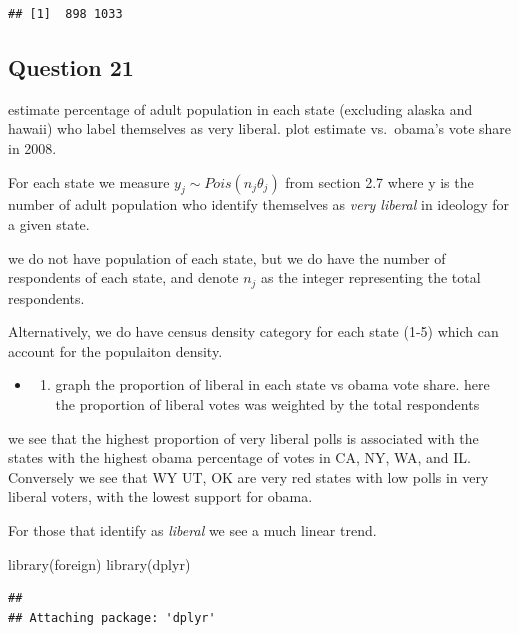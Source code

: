 \documentclass[
]{book}
\newenvironment{Shaded}{\begin{snugshade}}{\end{snugshade}}
\newcommand{\FunctionTok}[1]{\textcolor[rgb]{0.00,0.00,0.00}{#1}}
\newcommand{\NormalTok}[1]{#1}
\providecommand{\tightlist}{%
  \setlength{\itemsep}{0pt}\setlength{\parskip}{0pt}}
\theoremstyle{definition}
\theoremstyle{definition}
\theoremstyle{definition}
\theoremstyle{definition}
\theoremstyle{remark}
\begin{document}
\begin{verbatim}
## [1]  898 1033
\end{verbatim}

\hypertarget{question-21}{%
\subsection{Question 21}\label{question-21}}

estimate percentage of adult population in each state (excluding alaska and hawaii) who label themselves as very liberal. plot estimate vs.~obama's vote share in 2008.

For each state we measure \(y_j\sim Pois(n_j\theta_j)\) from section 2.7 where y is the number of adult population who identify themselves as \emph{very liberal} in ideology for a given state.

we do not have population of each state, but we do have the number of respondents of each state, and denote \(n_j\) as the integer representing the total respondents.

Alternatively, we do have census density category for each state (1-5) which can account for the populaiton density.

\begin{itemize}
\item
  \begin{enumerate}
  \def\labelenumi{(\alph{enumi})}
  \tightlist
  \item
    graph the proportion of liberal in each state vs obama vote share. here the proportion of liberal votes was weighted by the total respondents
  \end{enumerate}
\end{itemize}

we see that the highest proportion of very liberal polls is associated with the states with the highest obama percentage of votes in CA, NY, WA, and IL. Conversely we see that WY UT, OK are very red states with low polls in very liberal voters, with the lowest support for obama.

For those that identify as \emph{liberal} we see a much linear trend.

\begin{Shaded}
\begin{Highlighting}[]
 \FunctionTok{library}\NormalTok{(foreign)}
 \FunctionTok{library}\NormalTok{(dplyr)}
\end{Highlighting}
\end{Shaded}

\begin{verbatim}
## 
## Attaching package: 'dplyr'
\end{verbatim}
\end{document}
